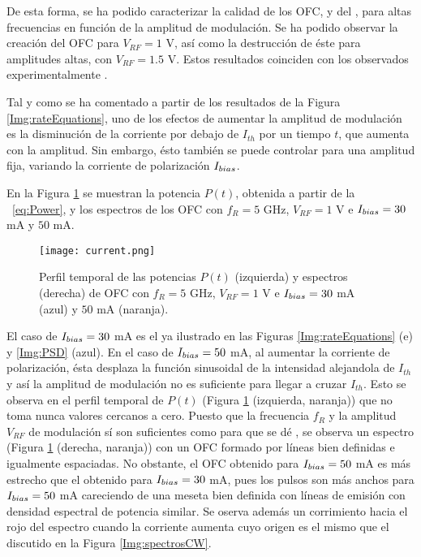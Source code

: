 		De esta forma, se ha podido caracterizar la calidad de los OFC, y del \gs, para altas frecuencias en función de la amplitud de modulaci\'on. Se ha podido observar la creaci\'on del OFC para $V_{RF} = 1$ V, as\'i como la destrucci\'on de éste para amplitudes altas, con $V_{RF} = 1.5$ V. Estos resultados coinciden con los observados experimentalmente \cite{artSim}.

		Tal y como se ha comentado a partir de los resultados de la Figura \ref{Img:rateEquations}, uno de los efectos de aumentar la amplitud de modulaci\'on es la disminuci\'on de la corriente por debajo de $I_{th}$ por un tiempo $t$, que aumenta con la amplitud. Sin embargo, \'esto también se puede controlar para una amplitud fija, variando la corriente de polarizaci\'on $I_{bias}$.

		En la Figura \ref{Img:current} se muestran la potencia $P(t)$, obtenida a partir de la \s\ \ref{eq:Power}, y los espectros de los OFC con $f_R = 5$ GHz, $V_{RF} = 1$ V e $I_{bias} = 30$ mA y $50$ mA.

			\begin{figure}[H]
				\centering
				\texttt{[image: current.png]}
				\caption{\label{Img:current}Perfil temporal de las potencias $P(t)$ (izquierda) y espectros (derecha) de OFC con $f_R = 5$ GHz, $V_{RF} = 1$ V e $I_{bias} = 30$ mA (azul) y $50$ mA (naranja).}	
			\end{figure}

		El caso de $I_{bias} = 30$ mA es el ya ilustrado en las Figuras \ref{Img:rateEquations} (e) y \ref{Img:PSD} (azul). En el caso de $I_{bias} = 50$ mA, al aumentar la corriente de polarizaci\'on, \'esta desplaza la función sinusoidal de la intensidad alejandola de $I_{th}$ y as\'i la amplitud de modulaci\'on no es suficiente para llegar a cruzar $I_{th}$. Esto se observa en el perfil temporal de $P(t)$ (Figura \ref{Img:current} (izquierda, naranja)) que no toma nunca valores cercanos a cero. Puesto que la frecuencia $f_R$ y la amplitud $V_{RF}$ de modulación s\'i son suficientes como para que se d\'e \gs, se observa un espectro (Figura \ref{Img:current} (derecha, naranja)) con un OFC formado por l\'ineas bien definidas e igualmente espaciadas. No obstante, el OFC obtenido para $I_{bias} = 50$ mA es m\'as estrecho que el obtenido para $I_{bias} = 30$ mA, pues los pulsos son más anchos para $I_{bias} = 50$ mA careciendo de una meseta bien definida con l\'ineas de emisi\'on con densidad espectral de potencia similar. Se oserva además un corrimiento hacia el rojo del espectro cuando la corriente aumenta cuyo origen es el mismo que el discutido en la Figura \ref{Img:spectrosCW}.

